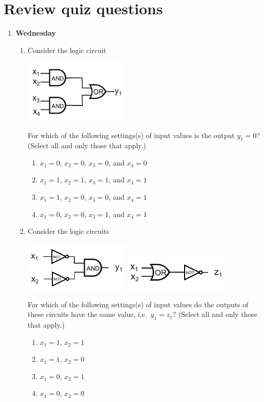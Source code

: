 \documentclass[12pt, oneside]{article}
\begin{document}
\section*{Review quiz questions}
\begin{enumerate}
\item {\bf Wednesday}
\begin{enumerate}
\item Consider the logic circuit
    \begin{center}
    \includegraphics[width=2in]{../resources/images/review-circuit-3.png}
    \end{center}
    For which of the following settings(s) of input values is the output
    $y_1 =  0$? (Select all and only those that apply.)
    \begin{enumerate}
        \item $x_1 = 0$, $x_2 = 0$, $x_3 = 0$, and $x_4 = 0$
        \item $x_1 = 1$, $x_2 = 1$, $x_3 = 1$, and $x_4 = 1$
        \item $x_1 = 1$, $x_2 = 0$, $x_3 = 0$, and $x_4 = 1$
        \item $x_1 = 0$, $x_2 = 0$, $x_3 = 1$, and $x_4 = 1$
    \end{enumerate}
\item Consider the logic circuits
    \begin{center}
    \includegraphics[width=2in]{../resources/images/review-circuit-1.png}
    \qquad \qquad \qquad
    \includegraphics[width=2in]{../resources/images/review-circuit-4.png}
    \end{center}
    For which  of the following settings(s) of input values do the outputs
    of these  circuits have the  same value, i.e.\ $y_1 =  z_1$? 
    (Select all and only those that apply.)
    \begin{enumerate}
        \item $x_1 = 1$, $x_2 = 1$
        \item $x_1 = 1$, $x_2 = 0$
        \item $x_1 = 0$, $x_2 = 1$
        \item $x_1 = 0$, $x_2 = 0$
    \end{enumerate}    
    

\end{enumerate}
\end{enumerate}
\end{document}
